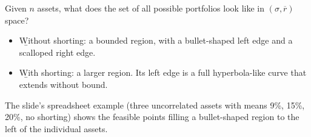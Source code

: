Given $n$ assets, what does the set of all possible portfolios look like in $(\sigma, \overline{r})$ space?
\begin{itemize}
    \item \b{Without shorting}: a bounded region, with a bullet-shaped left edge and a scalloped right edge.
    \item \b{With shorting}: a larger region. Its left edge is a full hyperbola-like curve that extends without bound.
\end{itemize}
\begin{center}
\end{center}
The slide's spreadsheet example (three uncorrelated assets with means 9\%, 15\%, 20\%, no shorting) shows the feasible points filling a bullet-shaped region to the left of the individual assets.

